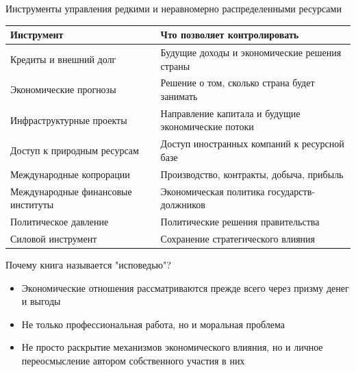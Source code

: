 \documentclass[10pt]{beamer}
\begin{document}
\begin{frame}{Инструменты управления редкими и неравномерно распределенными ресурсами}
\begin{table}[H]
\centering
\small
\begin{tabular}{|>{\centering\arraybackslash}p{4cm}|>{\centering\arraybackslash}p{6cm}|}
\hline
\textbf{Инструмент} & \textbf{Что позволяет контролировать}\\ \hline
Кредиты и внешний долг & Будущие доходы и экономические решения страны \\ \hline
Экономические прогнозы & Решение о том, сколько страна будет занимать \\ \hline
Инфраструктурные проекты & Направление капитала и будущие экономические потоки  \\ \hline
Доступ к природным ресурсам & Доступ иностранных компаний к ресурсной базе \\ \hline
Международные копрорации& Производство, контракты, добыча, прибыль \\ \hline
Международные финансовые институты & Экономическая политика государств-должников \\ \hline
Политическое давление & Политические решения правительства \\ \hline
Силовой инструмент & Сохранение стратегического влияния \\ \hline
\end{tabular} 
\end{table}
\end{frame}

\begin{frame}{Почему книга называется "исповедью"?}
\begin{itemize}
    \item Экономические отношения рассматриваются прежде всего через призму денег и выгоды
    \item Не только профессиональная работа, но и моральная проблема
    \item Не просто раскрытие механизмов экономического влияния, но и личное переосмысление автором собственного участия в них
\end{itemize}
\end{frame}
\end{document}
